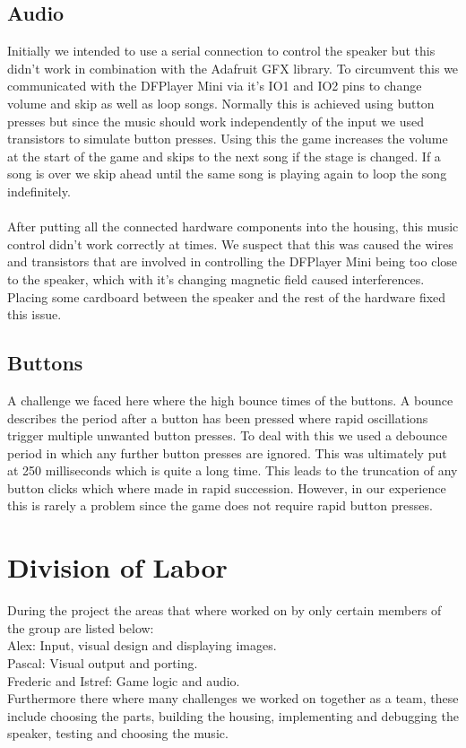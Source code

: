 \documentclass[10pt, a4paper]{article}
\begin{document}
\subsection*{Audio}
Initially we intended to use a serial connection to control the speaker but this didn't work in combination with the Adafruit GFX library. To circumvent this we communicated with the DFPlayer Mini via it's IO1 and IO2 pins to change volume and skip as well as loop songs. Normally this is achieved using button presses but since the music should work independently of the input we used transistors to simulate button presses. Using this the game increases the volume at the start of the game and skips to the next song if the stage is changed. If a song is over we skip ahead until the same song is playing again to loop the song indefinitely. \\\\
After putting all the connected hardware components into the housing, this music control didn't work correctly at times. We suspect that this was caused the wires and transistors that are involved in controlling the DFPlayer Mini being too close to the speaker, which with it's changing magnetic field caused interferences. Placing some cardboard between the speaker and the rest of the hardware fixed this issue. 

\subsection*{Buttons}
A challenge we faced here where the high bounce times of the buttons. A bounce describes the period after a button has been pressed where rapid oscillations trigger multiple unwanted button presses. To deal with this we used a debounce period in which any further button presses are ignored. This was ultimately put at 250 milliseconds which is quite a long time. This leads to the truncation of any button clicks which where made in rapid succession. However, in our experience this is rarely a problem since the game does not require rapid button presses. 

\section*{Division of Labor}
During the project the areas that where worked on by only certain members of the group are listed below:\\
Alex: Input, visual design and displaying images.\\
Pascal: Visual output and porting.\\
Frederic and Istref: Game logic and audio.\\
Furthermore there where many challenges we worked on together as a team, these include choosing the parts, building the housing, implementing and debugging the speaker, testing and choosing the music.
\end{document}
